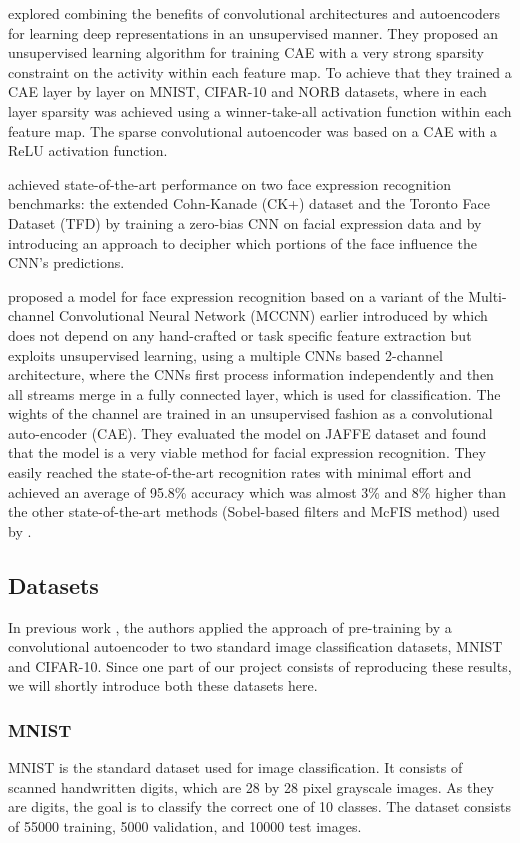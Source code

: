 \documentclass{article}
\begin{document}
\cite{Makhzani14} explored combining the benefits of convolutional architectures and autoencoders for learning deep representations in an unsupervised manner. They proposed an unsupervised learning algorithm for training CAE with a very strong sparsity constraint on the activity within each feature map. To achieve that they trained a CAE layer by layer on MNIST, CIFAR-10 and NORB datasets, where in each layer sparsity was achieved using a winner-take-all activation function within each feature map.  The sparse convolutional autoencoder was based on a CAE with a ReLU activation function.

\cite{Khorrami17} achieved state-of-the-art performance on two face expression recognition
benchmarks: the extended Cohn-Kanade (CK+) dataset
and the Toronto Face Dataset (TFD) by training a zero-bias CNN on facial expression data and by introducing an approach to decipher which portions of the face influence the CNN’s predictions.

\cite{hamester15} proposed a model for face expression recognition based on a variant of the Multi-channel Convolutional Neural Network (MCCNN) earlier introduced by \cite{Barros14} which does not depend on any hand-crafted or task specific feature extraction but exploits unsupervised learning, using a multiple CNNs based 2-channel architecture, where the CNNs first process information independently and then all streams merge in a fully connected layer, which is used for classification. The wights of the channel are trained in an unsupervised fashion as a convolutional auto-encoder (CAE). They evaluated the model on JAFFE dataset and found that the model is a very viable method for facial expression recognition. They easily reached the state-of-the-art recognition rates with minimal effort and achieved an average of 95.8\% accuracy which was almost 3\% and 8\% higher than the other state-of-the-art methods (Sobel-based filters and McFIS method) used by \cite{Subramanian12}.

\subsection{Datasets}
  In previous work \citep{masci2011stacked}, the authors applied the approach of pre-training by a convolutional autoencoder to two standard image classification datasets, MNIST and CIFAR-10.
  Since one part of our project consists of reproducing these results, we will shortly introduce both these datasets here.
  \subsubsection{MNIST}
    MNIST \citep{lecun1998mnist} is the standard dataset used for image classification. It consists of scanned handwritten digits, which are 28 by 28 pixel grayscale images. As they are digits, the goal is to classify the correct one of 10 classes.
    The dataset consists of 55000 training, 5000 validation, and 10000 test images.
\end{document}
